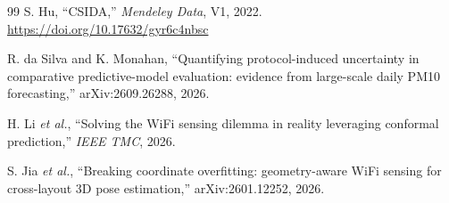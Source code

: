 \documentclass[journal,11pt]{IEEEtran}
\newcommand{\etal}{\textit{et al.}}
\begin{document}
\begin{thebibliography}{99}
 S. Hu, ``CSIDA,'' \emph{Mendeley Data}, V1, 2022. \url{https://doi.org/10.17632/gyr6c4nbsc}

 R. da Silva and K. Monahan, ``Quantifying protocol-induced uncertainty in comparative predictive-model evaluation: evidence from large-scale daily PM10 forecasting,'' arXiv:2609.26288, 2026.

 H. Li \etal, ``Solving the WiFi sensing dilemma in reality leveraging conformal prediction,'' \emph{IEEE TMC}, 2026.

 S. Jia \etal, ``Breaking coordinate overfitting: geometry-aware WiFi sensing for cross-layout 3D pose estimation,'' arXiv:2601.12252, 2026.

\end{thebibliography}
\end{document}
